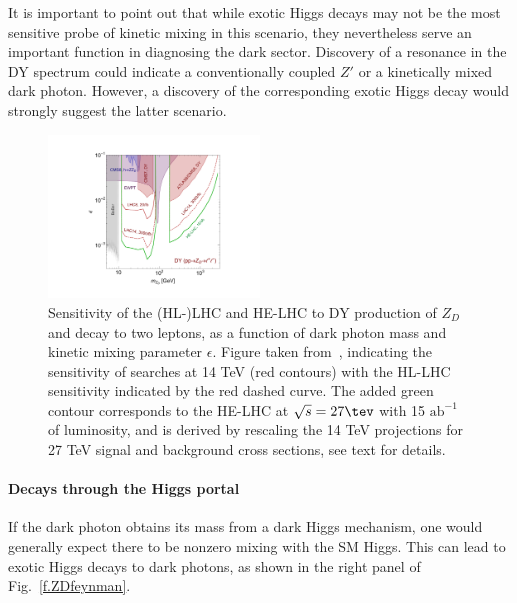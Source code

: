 It is important to point out that while exotic Higgs decays may not be the most sensitive probe of kinetic mixing in this scenario, they nevertheless serve an important function in diagnosing the dark sector. Discovery of a resonance in the DY spectrum could indicate a conventionally coupled $Z'$ or a kinetically mixed dark photon. However, a  discovery of the  corresponding exotic Higgs decay would strongly suggest the latter scenario. 


\begin{figure}
\begin{center}
\includegraphics[width=0.5\textwidth]{section9/plots/new_DYplot_epsilon}
\end{center}
\caption{
Sensitivity of the (HL-)LHC and HE-LHC to DY production of $Z_D$ and decay to two leptons,  as a function of dark photon mass and kinetic mixing parameter $\epsilon$. Figure taken from~\cite{Curtin:2014cca}, indicating the sensitivity of searches at 14 TeV (red contours) with the HL-LHC sensitivity indicated by the red dashed curve. The added green contour corresponds to the HE-LHC at $\sqrt{s} = 27 \tev$ with 15 $\mathrm{ab}^{-1}$ of luminosity, and is derived by rescaling the 14 TeV projections for 27 TeV signal and background cross sections, see text for details. 
}
\label{f.darkphotonDY}
\end{figure}


\bigskip

\paragraph{Decays through the Higgs portal}

If the dark photon obtains its mass from a dark Higgs mechanism, one would generally expect there to be nonzero mixing with the SM Higgs. This can lead to exotic Higgs decays to dark photons, as shown in the right panel of Fig.~\ref{f.ZDfeynman}. 


